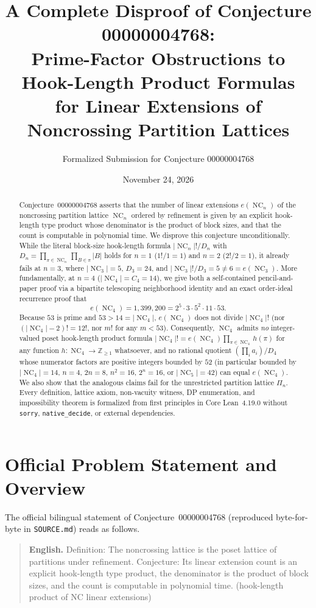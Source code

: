 \documentclass[11pt]{article}
\title{\textbf{A Complete Disproof of Conjecture 00000004768:\\
Prime-Factor Obstructions to Hook-Length Product Formulas\\
for Linear Extensions of Noncrossing Partition Lattices}}
\author{Formalized Submission for Conjecture 00000004768}
\date{November 24, 2026}
\theoremstyle{definition}
\newcommand{\NC}{\operatorname{NC}}
\begin{document}
\maketitle

\begin{abstract}
Conjecture~00000004768 asserts that the number of linear extensions $e(\NC_n)$ of the
noncrossing partition lattice $\NC_n$ ordered by refinement is given by an explicit
hook-length type product whose denominator is the product of block sizes, and that the
count is computable in polynomial time. We disprove this conjecture unconditionally.
While the literal block-size hook-length formula $|{\NC_n}|! / D_n$ with
$D_n = \prod_{\pi \in \NC_n} \prod_{B \in \pi} |B|$ holds for $n = 1$ ($1!/1 = 1$) and
$n = 2$ ($2!/2 = 1$), it already fails at $n = 3$, where $|\NC_3| = 5$, $D_3 = 24$, and
$|\NC_3|!/D_3 = 5 \ne 6 = e(\NC_3)$. More fundamentally, at $n = 4$ ($|\NC_4| = C_4 = 14$),
we give both a self-contained pencil-and-paper proof via a bipartite telescoping
neighborhood identity and an exact order-ideal recurrence proof that
\[
  e(\NC_4) = 1{,}399{,}200 = 2^5 \cdot 3 \cdot 5^2 \cdot 11 \cdot 53.
\]
Because $53$ is prime and $53 > 14 = |\NC_4|$, $e(\NC_4)$ does not divide $|\NC_4|!$
(nor $(|\NC_4|-2)! = 12!$, nor $m!$ for any $m < 53$). Consequently, $\NC_4$ admits
\emph{no} integer-valued poset hook-length product formula
$|\NC_4|! = e(\NC_4) \prod_{\pi \in \NC_4} h(\pi)$ for any function
$h : \NC_4 \to \mathbb{Z}_{\ge 1}$ whatsoever, and no rational quotient
$(\prod_i a_i)/D_4$ whose numerator factors are positive integers bounded by $52$ (in
particular bounded by $|\NC_4| = 14$, $n = 4$, $2n = 8$, $n^2 = 16$, $2^n = 16$, or
$|\NC_5| = 42$) can equal $e(\NC_4)$. We also show that the analogous claims fail for
the unrestricted partition lattice $\Pi_n$. Every definition, lattice axiom, non-vacuity
witness, DP enumeration, and impossibility theorem is formalized from first principles
in Core Lean~4.19.0 without \texttt{sorry}, \texttt{native\_decide}, or external
dependencies.
\end{abstract}

\section{Official Problem Statement and Overview}

The official bilingual statement of Conjecture~00000004768 (reproduced byte-for-byte in
\texttt{SOURCE.md}) reads as follows.

\begin{quote}
\textbf{English.} Definition: The noncrossing lattice is the poset lattice of partitions
under refinement. Conjecture: Its linear extension count is an explicit hook-length type
product, the denominator is the product of block sizes, and the count is computable in
polynomial time. (hook-length product of NC linear extensions)
\end{quote}
\end{document}
